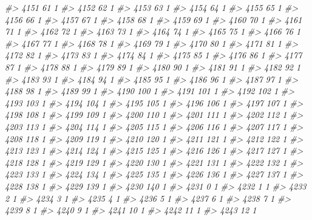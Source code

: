 \documentclass[]{article}
\newenvironment{Shaded}{\begin{snugshade}}{\end{snugshade}}
\newcommand{\CommentTok}[1]{\textcolor[rgb]{0.56,0.35,0.01}{\textit{#1}}}
\begin{document}
\begin{Shaded}
\begin{Highlighting}[]
\CommentTok{#> 4151  61  1}
\CommentTok{#> 4152  62  1}
\CommentTok{#> 4153  63  1}
\CommentTok{#> 4154  64  1}
\CommentTok{#> 4155  65  1}
\CommentTok{#> 4156  66  1}
\CommentTok{#> 4157  67  1}
\CommentTok{#> 4158  68  1}
\CommentTok{#> 4159  69  1}
\CommentTok{#> 4160  70  1}
\CommentTok{#> 4161  71  1}
\CommentTok{#> 4162  72  1}
\CommentTok{#> 4163  73  1}
\CommentTok{#> 4164  74  1}
\CommentTok{#> 4165  75  1}
\CommentTok{#> 4166  76  1}
\CommentTok{#> 4167  77  1}
\CommentTok{#> 4168  78  1}
\CommentTok{#> 4169  79  1}
\CommentTok{#> 4170  80  1}
\CommentTok{#> 4171  81  1}
\CommentTok{#> 4172  82  1}
\CommentTok{#> 4173  83  1}
\CommentTok{#> 4174  84  1}
\CommentTok{#> 4175  85  1}
\CommentTok{#> 4176  86  1}
\CommentTok{#> 4177  87  1}
\CommentTok{#> 4178  88  1}
\CommentTok{#> 4179  89  1}
\CommentTok{#> 4180  90  1}
\CommentTok{#> 4181  91  1}
\CommentTok{#> 4182  92  1}
\CommentTok{#> 4183  93  1}
\CommentTok{#> 4184  94  1}
\CommentTok{#> 4185  95  1}
\CommentTok{#> 4186  96  1}
\CommentTok{#> 4187  97  1}
\CommentTok{#> 4188  98  1}
\CommentTok{#> 4189  99  1}
\CommentTok{#> 4190 100  1}
\CommentTok{#> 4191 101  1}
\CommentTok{#> 4192 102  1}
\CommentTok{#> 4193 103  1}
\CommentTok{#> 4194 104  1}
\CommentTok{#> 4195 105  1}
\CommentTok{#> 4196 106  1}
\CommentTok{#> 4197 107  1}
\CommentTok{#> 4198 108  1}
\CommentTok{#> 4199 109  1}
\CommentTok{#> 4200 110  1}
\CommentTok{#> 4201 111  1}
\CommentTok{#> 4202 112  1}
\CommentTok{#> 4203 113  1}
\CommentTok{#> 4204 114  1}
\CommentTok{#> 4205 115  1}
\CommentTok{#> 4206 116  1}
\CommentTok{#> 4207 117  1}
\CommentTok{#> 4208 118  1}
\CommentTok{#> 4209 119  1}
\CommentTok{#> 4210 120  1}
\CommentTok{#> 4211 121  1}
\CommentTok{#> 4212 122  1}
\CommentTok{#> 4213 123  1}
\CommentTok{#> 4214 124  1}
\CommentTok{#> 4215 125  1}
\CommentTok{#> 4216 126  1}
\CommentTok{#> 4217 127  1}
\CommentTok{#> 4218 128  1}
\CommentTok{#> 4219 129  1}
\CommentTok{#> 4220 130  1}
\CommentTok{#> 4221 131  1}
\CommentTok{#> 4222 132  1}
\CommentTok{#> 4223 133  1}
\CommentTok{#> 4224 134  1}
\CommentTok{#> 4225 135  1}
\CommentTok{#> 4226 136  1}
\CommentTok{#> 4227 137  1}
\CommentTok{#> 4228 138  1}
\CommentTok{#> 4229 139  1}
\CommentTok{#> 4230 140  1}
\CommentTok{#> 4231   0  1}
\CommentTok{#> 4232   1  1}
\CommentTok{#> 4233   2  1}
\CommentTok{#> 4234   3  1}
\CommentTok{#> 4235   4  1}
\CommentTok{#> 4236   5  1}
\CommentTok{#> 4237   6  1}
\CommentTok{#> 4238   7  1}
\CommentTok{#> 4239   8  1}
\CommentTok{#> 4240   9  1}
\CommentTok{#> 4241  10  1}
\CommentTok{#> 4242  11  1}
\CommentTok{#> 4243  12  1}

\end{Highlighting}
\end{Shaded}
\end{document}
